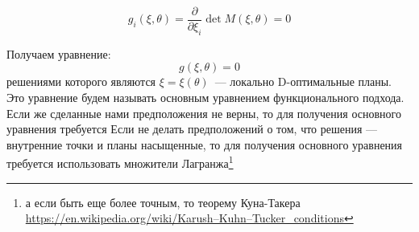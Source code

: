 \begin{equation}
g_i(\xi, \theta) = \frac{\partial{}}{\partial{\xi_i}} \det M(\xi, \theta) = 0
\end{equation} 

Получаем уравнение:
$$g(\xi, \theta) = 0$$
решениями которого являются $\xi = \xi(\theta)$ — локально D-оптимальные планы.  Это уравнение будем называть основным уравнением функционального подхода. Если же сделанные нами предположения не верны, то для получения основного уравнения требуется 
 Если не делать предположений о том, что решения — внутренние точки и планы насыщенные, то для получения основного уравнения требуется использовать множители Лагранжа\footnote{а если быть еще более точным, то теорему Куна-Такера \url{https://en.wikipedia.org/wiki/Karush–Kuhn–Tucker_conditions}}
